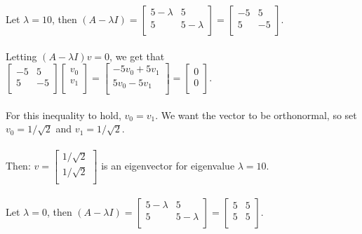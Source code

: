 \documentclass[11pt]{article}
\begin{document}
Let $\lambda = 10$, then $(A - \lambda I) = \begin{bmatrix}
5 - \lambda & 5 \\
5 & 5 - \lambda \\
\end{bmatrix} = \begin{bmatrix}
-5 & 5 \\
5 & -5 \\
\end{bmatrix}$. \\\\
Letting $(A - \lambda I)v = 0$, we get that $ \begin{bmatrix}
-5 & 5 \\
5 & -5 \\
\end{bmatrix} \begin{bmatrix}
v_0 \\
v_1 \\
\end{bmatrix} = \begin{bmatrix}
-5v_0 + 5v_1 \\
5v_0 -5v_1 \\
\end{bmatrix} = \begin{bmatrix}
0 \\
0 \\
\end{bmatrix} $. \\\\
For this inequality to hold, $v_0 = v_1$. We want the vector to be orthonormal, so set $v_0 = 1 / \sqrt2$ and $v_1 = 1 / \sqrt2.$ \\\\
Then: $v = \begin{bmatrix}
1 / \sqrt2 \\
1 / \sqrt2 \\
\end{bmatrix}$ is an eigenvector for eigenvalue $\lambda = 10$. \\\\
Let $\lambda = 0$, then $(A - \lambda I) = \begin{bmatrix}
5 - \lambda & 5 \\
5 & 5 - \lambda \\
\end{bmatrix} = \begin{bmatrix}
5 & 5 \\
5 & 5 \\
\end{bmatrix}$. \\\\
\end{document}
